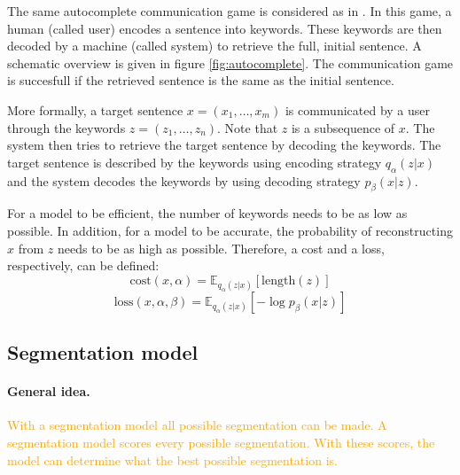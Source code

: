 The same autocomplete communication game is considered as in . In this game, a human (called user) encodes a sentence into keywords. 
These keywords are then decoded by a machine (called system) to retrieve the full, initial sentence. 
A schematic overview is given in figure \ref{fig:autocomplete}. 
The communication game is succesfull if the retrieved sentence is the same as the initial sentence. 

More formally, a target sentence $x=(x_1, \dots, x_m)$ is communicated by a user through the keywords $z=(z_1, \dots, z_n)$. 
Note that $z$ is a subsequence of $x$. 
The system then tries to retrieve the target sentence by decoding the keywords. 
The target sentence is described by the keywords using encoding strategy $q_{\alpha}(z | x)$ and the system decodes the keywords by using decoding strategy $p_{\beta}(x|z)$. 

For a model to be efficient, the number of keywords needs to be as low as possible. 
In addition, for a model to be accurate, the probability of reconstructing $x$ from $z$ needs to be as high as possible. 
Therefore, a cost and a loss, respectively, can be defined:
\begin{equation}
    \label{eq:cost}
    \text{cost}(x,\alpha) = \mathbb{E}_{q_{\alpha}(z|x)} [\text{length}(z)]
\end{equation}
\begin{equation}
    \label{eq:loss}
    \text{loss}(x,\alpha,\beta) = \mathbb{E}_{q_{\alpha}(z|x)} [-\log p_{\beta}(x|z)]
\end{equation}

\subsection{Segmentation model}
\label{sec:segmentation}

\paragraph{General idea.}
\textcolor{orange}{With a segmentation model all possible segmentation can be made. 
A segmentation model scores every possible segmentation.
With these scores, the model can determine what the best possible segmentation is.}

